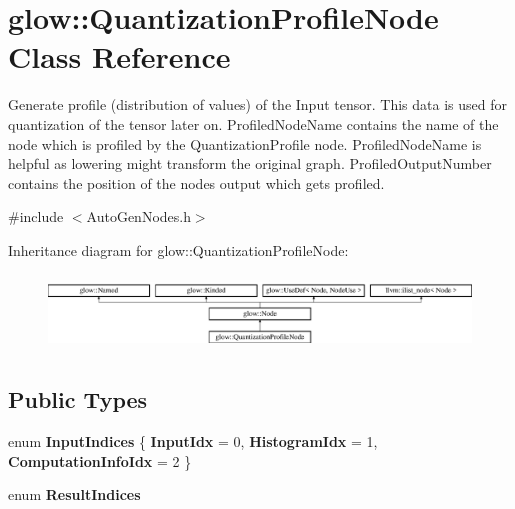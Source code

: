 \hypertarget{classglow_1_1_quantization_profile_node}{}\section{glow\+:\+:Quantization\+Profile\+Node Class Reference}
\label{classglow_1_1_quantization_profile_node}


Generate profile (distribution of values) of the Input tensor. This data is used for quantization of the tensor later on. Profiled\+Node\+Name contains the name of the node which is profiled by the Quantization\+Profile node. Profiled\+Node\+Name is helpful as lowering might transform the original graph. Profiled\+Output\+Number contains the position of the node\textquotesingle{}s output which gets profiled.  




{\ttfamily \#include $<$Auto\+Gen\+Nodes.\+h$>$}

Inheritance diagram for glow\+:\+:Quantization\+Profile\+Node\+:\begin{figure}[H]
\begin{center}
\leavevmode
\includegraphics[height=2.028986cm]{classglow_1_1_quantization_profile_node}
\end{center}
\end{figure}
\subsection*{Public Types}
\begin{DoxyCompactItemize}
\item 
\mbox{\label{classglow_1_1_quantization_profile_node_a14f730de956c2aa7db83a5402e11e694}} 
enum {\bfseries Input\+Indices} \{ {\bfseries Input\+Idx} = 0, 
{\bfseries Histogram\+Idx} = 1, 
{\bfseries Computation\+Info\+Idx} = 2
 \}
\item 
\mbox{\label{classglow_1_1_quantization_profile_node_ad40161e401ab11d4c918b3f1ec199add}} 
enum {\bfseries Result\+Indices} 
\end{DoxyCompactItemize}
